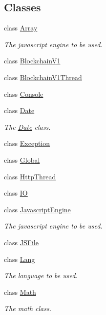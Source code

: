 \subsection*{Classes}
\begin{DoxyCompactItemize}
\item 
class \mbox{\hyperlink{class_rad_j_a_v_1_1_array}{Array}}
\begin{DoxyCompactList}\small\item\em The javascript engine to be used. \end{DoxyCompactList}\item 
class \mbox{\hyperlink{class_rad_j_a_v_1_1_blockchain_v1}{Blockchain\+V1}}
\item 
class \mbox{\hyperlink{class_rad_j_a_v_1_1_blockchain_v1_thread}{Blockchain\+V1\+Thread}}
\item 
class \mbox{\hyperlink{class_rad_j_a_v_1_1_console}{Console}}
\item 
class \mbox{\hyperlink{class_rad_j_a_v_1_1_date}{Date}}
\begin{DoxyCompactList}\small\item\em The \mbox{\hyperlink{class_rad_j_a_v_1_1_date}{Date}} class. \end{DoxyCompactList}\item 
class \mbox{\hyperlink{class_rad_j_a_v_1_1_exception}{Exception}}
\item 
class \mbox{\hyperlink{class_rad_j_a_v_1_1_global}{Global}}
\item 
class \mbox{\hyperlink{class_rad_j_a_v_1_1_http_thread}{Http\+Thread}}
\item 
class \mbox{\hyperlink{class_rad_j_a_v_1_1_i_o}{IO}}
\item 
class \mbox{\hyperlink{class_rad_j_a_v_1_1_javascript_engine}{Javascript\+Engine}}
\begin{DoxyCompactList}\small\item\em The javascript engine to be used. \end{DoxyCompactList}\item 
class \mbox{\hyperlink{class_rad_j_a_v_1_1_j_s_file}{J\+S\+File}}
\item 
class \mbox{\hyperlink{class_rad_j_a_v_1_1_lang}{Lang}}
\begin{DoxyCompactList}\small\item\em The language to be used. \end{DoxyCompactList}\item 
class \mbox{\hyperlink{class_rad_j_a_v_1_1_math}{Math}}
\begin{DoxyCompactList}\small\item\em The math class. \end{DoxyCompactList}\item 

\end{DoxyCompactItemize}
